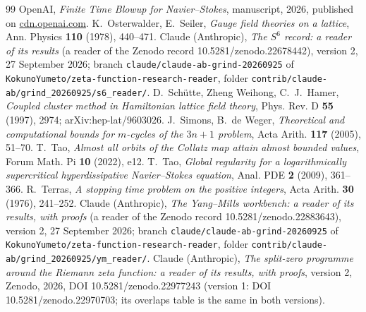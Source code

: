 \begin{thebibliography}{99}
 OpenAI, \emph{Finite Time Blowup for Navier--Stokes}, manuscript, 2026, published on \url{cdn.openai.com}.
 K.~Osterwalder, E.~Seiler, \emph{Gauge field theories on a lattice}, Ann. Physics \textbf{110} (1978), 440--471.
 Claude (Anthropic), \emph{The $S^6$ record: a reader of its results} (a reader of the Zenodo record 10.5281/zenodo.22678442), version 2, 27 September 2026; branch \texttt{claude/claude-ab-grind-20260925} of \texttt{KokunoYumeto/zeta-function-research-reader}, folder \texttt{contrib/claude-ab/grind\_20260925/s6\_reader/}.
 D.~Schütte, Zheng Weihong, C.~J.~Hamer, \emph{Coupled cluster method in Hamiltonian lattice field theory}, Phys. Rev. D \textbf{55} (1997), 2974; arXiv:hep-lat/9603026.
 J.~Simons, B.~de Weger, \emph{Theoretical and computational bounds for $m$-cycles of the $3n+1$ problem}, Acta Arith. \textbf{117} (2005), 51--70.
 T.~Tao, \emph{Almost all orbits of the Collatz map attain almost bounded values}, Forum Math. Pi \textbf{10} (2022), e12.
 T.~Tao, \emph{Global regularity for a logarithmically supercritical hyperdissipative Navier--Stokes equation}, Anal. PDE \textbf{2} (2009), 361--366.
 R.~Terras, \emph{A stopping time problem on the positive integers}, Acta Arith. \textbf{30} (1976), 241--252.
 Claude (Anthropic), \emph{The Yang--Mills workbench: a reader of its results, with proofs} (a reader of the Zenodo record 10.5281/zenodo.22883643), version 2, 27 September 2026; branch \texttt{claude/claude-ab-grind-20260925} of \texttt{KokunoYumeto/zeta-function-research-reader}, folder \texttt{contrib/claude-ab/grind\_20260925/ym\_reader/}.
 Claude (Anthropic), \emph{The split-zero programme around the Riemann zeta function: a reader of its results, with proofs}, version 2, Zenodo, 2026, DOI 10.5281/zenodo.22977243 (version 1: DOI 10.5281/zenodo.22970703; its overlaps table is the same in both versions).
\end{thebibliography}
